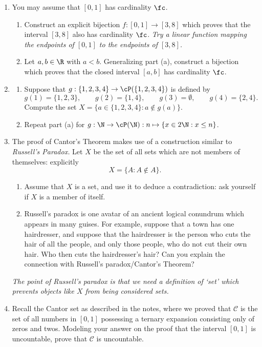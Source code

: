 \begin{enumerate}\renewcommand{\labelenumi}{\thesubsection.\theenumi}
  \item You may assume that $[0,1]$ has cardinality $\fc$.
  \begin{enumerate}
    \item Construct an explicit bijection $f:[0,1]\to [3,8]$ which proves that the interval $[3,8]$ also has cardinality $\fc$. \emph{Try a linear function mapping the endpoints of $[0,1]$ to the endpoints of $[3,8]$.}
    \item Let $a,b\in\R$ with $a<b$. Generalizing part (a), construct a bijection which proves that the closed interval $[a,b]$ has cardinality $\fc$.
  \end{enumerate}
  
  \item\begin{enumerate}
    \item Suppose that $g:\{1,2,3,4\}\to\cP(\{1,2,3,4\})$ is defined by
  	\[g(1)=\{1,2,3\},\qquad g(2)=\{1,4\},\qquad g(3)=\emptyset,\qquad g(4)=\{2,4\}.\]
  	Compute the set $X=\bigl\{a\in\{1,2,3,4\}:a\not\in g(a)\bigr\}$.
  	\item Repeat part (a) for $g:\N\to\cP(\N):n\mapsto\{x\in 2\N:x\le n\}$.
  \end{enumerate}
  
   \item The proof of Cantor's Theorem makes use of a construction similar to \emph{Russell's Paradox.} Let $X$ be the set of all sets which are not members of themselves: explicitly
  	\[X=\{A:A\not\in A\}.\]
  	\begin{enumerate}
    	\item Assume that $X$ is a set, and use it to deduce a contradiction: ask yourself if $X$ is a member of itself.
    	\item Russell's paradox is one avatar of an ancient logical conundrum which appears in many guises. For example, suppose that a town has one hairdresser, and suppose that the hairdresser is the person who cuts the hair of all the people, and only those people, who do not cut their own hair. Who then cuts the hairdresser's hair? Can you explain the connection with Russell's paradox/Cantor's Theorem?
  	\end{enumerate}
  	\emph{The point of Russell's paradox is that we need a definition of `set' which prevents objects like $X$ from being considered sets.}
  
	\item Recall the Cantor set as described in the notes, where we proved that $\mathcal C$ is the set of all numbers in $[0,1]$ possessing a ternary expansion consisting only of zeros and twos. Modeling your answer on the proof that the interval $[0,1]$ is uncountable, prove that $\mathcal C$ is uncountable.
	

\end{enumerate}
